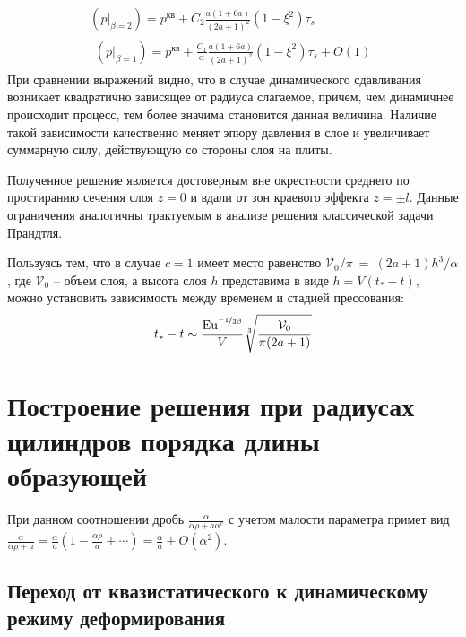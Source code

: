 \begin{gather}
  \left(p\lvert_{\beta=2}\right) = p^\text{кв} + C_2 \frac{a(1+6a)}{(2a+1)^2}\left(1-\xi^2\right) \tau_{s}
  \\
  \begin{multlined}
    \left(p\lvert_{\beta=1}\right) = p^\text{кв}+ \frac{C_1}{\alpha} \frac{a(1+6a)}{(2a+1)^2}\left(1-\xi^2\right)\tau_{s} + O(1)
  \end{multlined}
\end{gather}
При сравнении выражений видно, что в случае динамического сдавливания возникает квадратично зависящее от радиуса слагаемое, причем, чем динамичнее происходит процесс, тем более значима становится данная величина. Наличие такой зависимости качественно меняет эпюру давления в слое и увеличивает суммарную силу, действующую со стороны слоя на плиты.

Полученное решение является достоверным вне окрестности среднего по простиранию сечения слоя $z=0$ и вдали от зон краевого эффекта $z=\pm l$. Данные ограничения аналогичны трактуемым в анализе решения классической задачи Прандтля.

Пользуясь тем, что в случае $c=1$ имеет место равенство $\mathcal{V}_0 / \pi~=~\left(2a + 1\right) h^{3} / \alpha$, где $\mathcal{V}_0$ -- объем слоя, а высота слоя $h$ представима в виде $h=V \left(t_*-t\right)$, можно установить зависимость между временем и стадией прессования:
\begin{equation}
  t_* - t \sim \frac{\text{Eu}^{\nicefrac{-1}{3\beta}}}{V}\sqrt[3]{\frac{\mathcal{V}_0}{\pi(2a+1)}}
\end{equation}

\section{Построение решения при радиусах цилиндров порядка длины образующей}\label{sec:ch2/sec4}

При данном соотношении дробь $\frac{\alpha}{\alpha\rho+a \alpha^c}$ с учетом малости параметра примет вид $\frac{\alpha}{\alpha\rho+a} = \frac{\alpha}{a}\left(1-\frac{\alpha\rho}{a}+\cdots\right) = \frac{\alpha}{a} + O\left(\alpha^2\right)$.

\subsection{Переход от квазистатического к динамическому режиму деформирования}\label{subsec:ch2/sec4/sub1}

